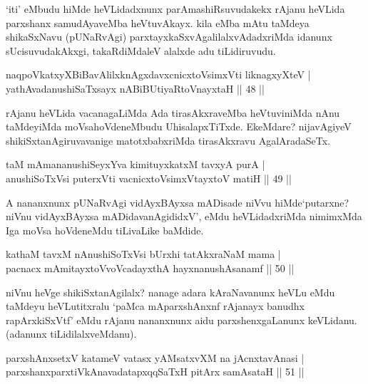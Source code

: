 \begin{artha}
`iti' eMbudu hiMde heVLidadxnunx parAmashiRsuvudakekx rAjanu heVLida 
parxshanx samudAyaveMba heVtuvAkayx. kila eMba mAtu taMdeya 
shikaSxNavu (pUNaRvAgi) parxtayxkaSxvAgalilalxvAdadxriMda idanunx
sUcisuvudakAkxgi, takaRdiMdaleV alalxde adu tiLidiruvudu.
\end{artha}

\begin{shl}
naqpoVkatxyXBiBavAlilxknAgxdavxcnicxtoV\s simxVti liknagxyXteV | \\
yathAvadanushiSaTxsayx nABiBUtiyaRtoV\s nayxtaH \hfill|| 48 || 
\end{shl}

\begin{artha}
rAjanu heVLida vacanagaLiMda Ada tirasAkxraveMba heVtuviniMda 
nAnu taMdeyiMda moVsahoVdeneMbudu UhisalapxTiTxde. EkeMdare? 
nijavAgiyeV shikiSxtanAgiruvavanige matotxbabxriMda tirasAkxravu 
AgalAradaSeTx.
\end{artha}


\begin{shl}
taM mAmananushiSeyxYva kimituyxkatxM tavxyA purA | \\
anushiSoTxV\s si puterxVti vacnicxtoV\s simxVtayxtoV matiH \hfill|| 49 || 
\end{shl}

\begin{artha}
A nananxnunx pUNaRvAgi vidAyxBAyxsa mADisade niVvu hiMde`putarxne? 
niVnu vidAyxBAyxsa mADidavanAgididxV', eMdu heVLidadxriMda nimimxMda 
Iga moVsa hoVdeneMdu tiLivaLike baMdide.
\end{artha}

\begin{shl}
kathaM tavxM nAnushiSoTxV\s si bUrxhi tatAkxraNaM mama | \\
pacnacx mAmitayxtoV\s voVcadayxthA hayxnanushAsanamf \hfill|| 50 || 
\end{shl}

\begin{artha}
niVnu heVge shikiSxtanAgilalx? nanage adara kAraNavanunx heVLu eMdu 
taMdeyu heVLutitxralu `paMca mAparxshAnxnf rAjanayx banudhx 
rapArxkiSxVtf' eMdu rAjanu nananxnunx aidu parxshenxgaLanunx 
keVLidanu. (adanunx tiLidilalxveMdanu).
\end{artha}

\begin{shl}
parxshAnxsetxV katameV vatasx yAMsatxvXM na jAcnxtavAnasi | \\
parxshanxparxtiVkAnavadatapxqqSaTxH pitArx samAsataH \hfill|| 51 || 
\end{shl}


